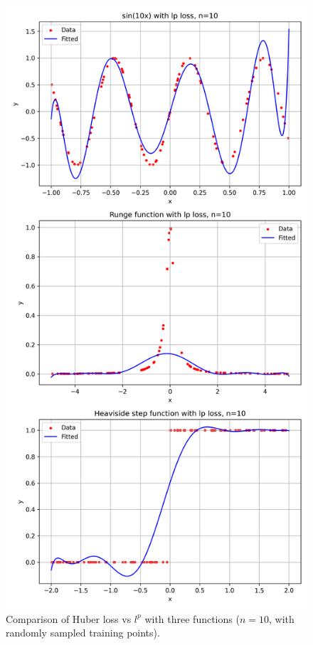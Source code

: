 \documentclass[a4paper,12pt]{article}
\begin{document}
\begin{figure}[b!]
\begin{minipage}{0.49\textwidth}
    \end{minipage}
    \hfill
    \begin{minipage}{0.49\textwidth}
        \centering
        \includegraphics[width=\linewidth]{fig/compare_lp_loss (1).png}
    \end{minipage}

    \caption{Comparison of Huber loss vs \( l^p \) with three functions ($n=10$, with randomly sampled training points).}
    \label{fig:comparison(1)}
\end{figure}
\end{document}
